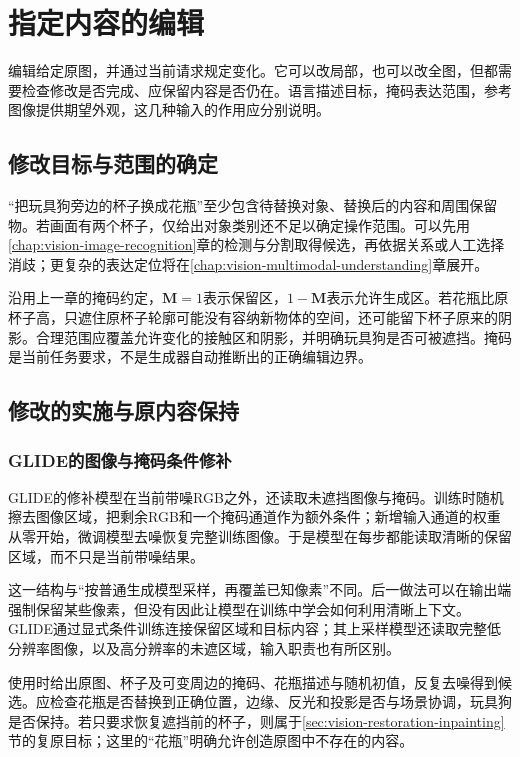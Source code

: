 \section{指定内容的编辑}
\label{sec:vision-generation-editing}

编辑给定原图，并通过当前请求规定变化。它可以改局部，也可以改全图，但都需要检查修改是否完成、应保留内容是否仍在。语言描述目标，掩码表达范围，参考图像提供期望外观，这几种输入的作用应分别说明。

\subsection{修改目标与范围的确定}
\label{sec:vision-generation-editing-scope}

“把玩具狗旁边的杯子换成花瓶”至少包含待替换对象、替换后的内容和周围保留物。若画面有两个杯子，仅给出对象类别还不足以确定操作范围。可以先用\ref{chap:vision-image-recognition}章的检测与分割取得候选，再依据关系或人工选择消歧；更复杂的表达定位将在\ref{chap:vision-multimodal-understanding}章展开。

沿用上一章的掩码约定，$\bm{M}=1$表示保留区，$1-\bm{M}$表示允许生成区。若花瓶比原杯子高，只遮住原杯子轮廓可能没有容纳新物体的空间，还可能留下杯子原来的阴影。合理范围应覆盖允许变化的接触区和阴影，并明确玩具狗是否可被遮挡。掩码是当前任务要求，不是生成器自动推断出的正确编辑边界。

\subsection{修改的实施与原内容保持}
\label{sec:vision-generation-editing-methods}

\subsubsection{GLIDE的图像与掩码条件修补}
\label{sec:vision-generation-glide-inpainting}

GLIDE的修补模型在当前带噪RGB之外，还读取未遮挡图像与掩码。训练时随机擦去图像区域，把剩余RGB和一个掩码通道作为额外条件；新增输入通道的权重从零开始，微调模型去噪恢复完整训练图像。于是模型在每步都能读取清晰的保留区域，而不只是当前带噪结果。

这一结构与“按普通生成模型采样，再覆盖已知像素”不同。后一做法可以在输出端强制保留某些像素，但没有因此让模型在训练中学会如何利用清晰上下文。GLIDE通过显式条件训练连接保留区域和目标内容；其上采样模型还读取完整低分辨率图像，以及高分辨率的未遮区域，输入职责也有所区别。

使用时给出原图、杯子及可变周边的掩码、花瓶描述与随机初值，反复去噪得到候选。应检查花瓶是否替换到正确位置，边缘、反光和投影是否与场景协调，玩具狗是否保持。若只要求恢复遮挡前的杯子，则属于\ref{sec:vision-restoration-inpainting}节的复原目标；这里的“花瓶”明确允许创造原图中不存在的内容。

